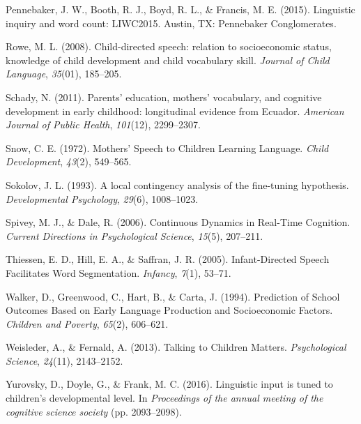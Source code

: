 \documentclass[10pt, letterpaper]{article}
\begin{document}
\leavevmode\hypertarget{ref-Pennebaker:kqtgxul0}{}%
Pennebaker, J. W., Booth, R. J., Boyd, R. L., \& Francis, M. E. (2015).
Linguistic inquiry and word count: LIWC2015. Austin, TX: Pennebaker
Conglomerates.

\leavevmode\hypertarget{ref-ROWE:2008go}{}%
Rowe, M. L. (2008). Child-directed speech: relation to socioeconomic
status, knowledge of child development and child vocabulary skill.
\emph{Journal of Child Language}, \emph{35}(01), 185--205.

\leavevmode\hypertarget{ref-Schady:2011bb}{}%
Schady, N. (2011). Parents' education, mothers' vocabulary, and
cognitive development in early childhood: longitudinal evidence from
Ecuador. \emph{American Journal of Public Health}, \emph{101}(12),
2299--2307.

\leavevmode\hypertarget{ref-Snow:2018wf}{}%
Snow, C. E. (1972). Mothers' Speech to Children Learning Language.
\emph{Child Development}, \emph{43}(2), 549--565.

\leavevmode\hypertarget{ref-Sokolov:1993cr}{}%
Sokolov, J. L. (1993). A local contingency analysis of the fine-tuning
hypothesis. \emph{Developmental Psychology}, \emph{29}(6), 1008--1023.

\leavevmode\hypertarget{ref-Spivey:2006fa}{}%
Spivey, M. J., \& Dale, R. (2006). Continuous Dynamics in Real-Time
Cognition. \emph{Current Directions in Psychological Science},
\emph{15}(5), 207--211.

\leavevmode\hypertarget{ref-Thiessen:2005tx}{}%
Thiessen, E. D., Hill, E. A., \& Saffran, J. R. (2005). Infant-Directed
Speech Facilitates Word Segmentation. \emph{Infancy}, \emph{7}(1),
53--71.

\leavevmode\hypertarget{ref-Anonymous:GIFaG1Qd}{}%
Walker, D., Greenwood, C., Hart, B., \& Carta, J. (1994). Prediction of
School Outcomes Based on Early Language Production and Socioeconomic
Factors. \emph{Children and Poverty}, \emph{65}(2), 606--621.

\leavevmode\hypertarget{ref-Weisleder:2013ht}{}%
Weisleder, A., \& Fernald, A. (2013). Talking to Children Matters.
\emph{Psychological Science}, \emph{24}(11), 2143--2152.

\leavevmode\hypertarget{ref-Anonymous:r2JoRscQ}{}%
Yurovsky, D., Doyle, G., \& Frank, M. C. (2016). Linguistic input is
tuned to children's developmental level. In \emph{Proceedings of the
annual meeting of the cognitive science society} (pp. 2093--2098).


\end{document}
